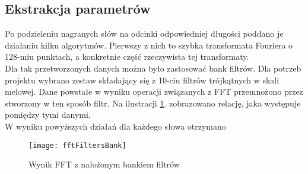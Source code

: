 \subsection{Ekstrakcja parametrów}

Po podzieleniu nagranych słów na odcinki odpowiedniej długości poddano je działaniu kilku algorytmów. Pierwszy z nich to szybka transformata Fouriera o 128-miu punktach, a konkretnie część rzeczywista tej transformaty. \\
Dla tak przetworzonych danych można było zastosować bank filtrów. Dla potrzeb projektu wybrano zestaw składający się z 10-ciu filtrów trójkątnych w skali melowej. Dane powstałe w wyniku operacji związanych z FFT przemnożono przez stworzony w ten sposób filtr. Na ilustracji \ref{rys:fftFiltry}. zobrazowano relację, jaka występuje pomiędzy tymi danymi. \\
W wyniku powyższych działań dla każdego słowa otrzymano 

\begin{figure}[H]
	\centering
	\texttt{[image: fftFiltersBank]}
	\caption{Wynik FFT z nałożonym bankiem filtrów}
	\label{rys:fftFiltry}
\end{figure}